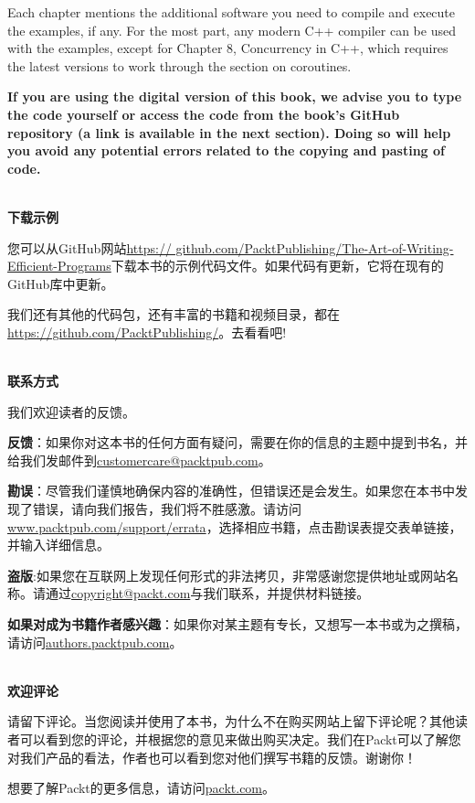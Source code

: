 Each chapter mentions the additional software you need to compile and execute the examples, if any. For the most part, any modern C++ compiler can be used with the examples, except for Chapter 8, Concurrency in C++, which requires the latest versions to work through the section on coroutines.

\textbf{If you are using the digital version of this book, we advise you to type the code yourself or access the code from the book's GitHub repository (a link is available in the next 	section). Doing so will help you avoid any potential errors related to the copying and 	pasting of code.}

\hspace*{\fill} \\ %
\textbf{下载示例}

您可以从GitHub网站\url{https://	github.com/PacktPublishing/The-Art-of-Writing-Efficient-Programs}下载本书的示例代码文件。如果代码有更新，它将在现有的GitHub库中更新。

我们还有其他的代码包，还有丰富的书籍和视频目录，都在\url{https://github.com/PacktPublishing/}。去看看吧!

\hspace*{\fill} \\ %
\textbf{联系方式}

我们欢迎读者的反馈。

\textbf{反馈}：如果你对这本书的任何方面有疑问，需要在你的信息的主题中提到书名，并给我们发邮件到\url{customercare@packtpub.com}。

\textbf{勘误}：尽管我们谨慎地确保内容的准确性，但错误还是会发生。如果您在本书中发现了错误，请向我们报告，我们将不胜感激。请访问\url{www.packtpub.com/support/errata}，选择相应书籍，点击勘误表提交表单链接，并输入详细信息。

\textbf{盗版}:如果您在互联网上发现任何形式的非法拷贝，非常感谢您提供地址或网站名称。请通过\url{copyright@packt.com}与我们联系，并提供材料链接。

\textbf{如果对成为书籍作者感兴趣}：如果你对某主题有专长，又想写一本书或为之撰稿，请访问\url{authors.packtpub.com}。

\hspace*{\fill} \\ %
\textbf{欢迎评论}

请留下评论。当您阅读并使用了本书，为什么不在购买网站上留下评论呢？其他读者可以看到您的评论，并根据您的意见来做出购买决定。我们在Packt可以了解您对我们产品的看法，作者也可以看到您对他们撰写书籍的反馈。谢谢你！

想要了解Packt的更多信息，请访问\url{packt.com}。










